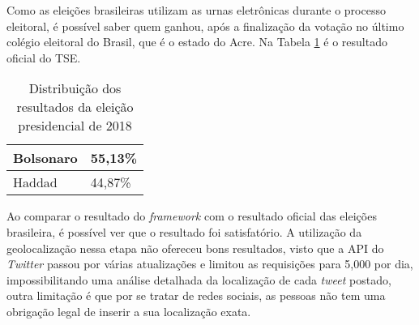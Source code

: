  
 Como as eleições brasileiras utilizam as urnas eletrônicas durante o processo eleitoral, é possível saber 
 quem ganhou, após a finalização da votação no último colégio eleitoral do Brasil, que é o estado do Acre. Na Tabela
 \ref{tb:tse2018} é o resultado oficial do \acrshort{TSE}.
 
 
 \begin{table}[tbp]
     \centering
     \caption{Distribuição dos resultados da eleição presidencial de 2018}
     \label{tb:tse2018}
     \begin{tabular}{ll}
     \hline
     Bolsonaro & 55,13\% \\ \hline
     Haddad & 44,87\% \\ \hline
     \end{tabular}
 \end{table}
 
 
 Ao comparar o resultado do \textit{framework} com o resultado oficial das eleições brasileira, é possível ver 
 que o resultado foi satisfatório. A utilização da geolocalização nessa etapa não ofereceu bons resultados, visto que
 a \acrshort{API} do \textit{Twitter} passou por várias atualizações e limitou as requisições para 5,000 por dia, impossibilitando 
 uma análise detalhada da localização de cada \textit{tweet} postado, outra limitação é que por se tratar de redes sociais, as pessoas
 não tem uma obrigação legal de inserir a sua localização exata.